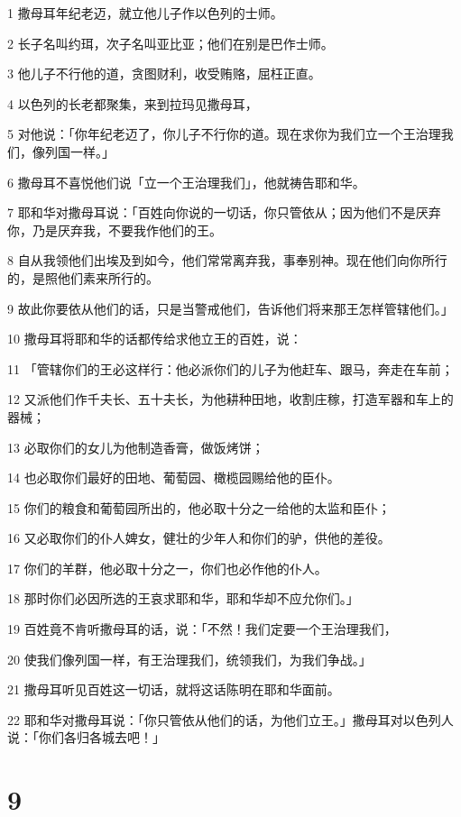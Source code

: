 \par 1 撒母耳年纪老迈，就立他儿子作以色列的士师。
\par 2 长子名叫约珥，次子名叫亚比亚；他们在别是巴作士师。
\par 3 他儿子不行他的道，贪图财利，收受贿赂，屈枉正直。
\par 4 以色列的长老都聚集，来到拉玛见撒母耳，
\par 5 对他说：「你年纪老迈了，你儿子不行你的道。现在求你为我们立一个王治理我们，像列国一样。」
\par 6 撒母耳不喜悦他们说「立一个王治理我们」，他就祷告耶和华。
\par 7 耶和华对撒母耳说：「百姓向你说的一切话，你只管依从；因为他们不是厌弃你，乃是厌弃我，不要我作他们的王。
\par 8 自从我领他们出埃及到如今，他们常常离弃我，事奉别神。现在他们向你所行的，是照他们素来所行的。
\par 9 故此你要依从他们的话，只是当警戒他们，告诉他们将来那王怎样管辖他们。」
\par 10 撒母耳将耶和华的话都传给求他立王的百姓，说：
\par 11 「管辖你们的王必这样行：他必派你们的儿子为他赶车、跟马，奔走在车前；
\par 12 又派他们作千夫长、五十夫长，为他耕种田地，收割庄稼，打造军器和车上的器械；
\par 13 必取你们的女儿为他制造香膏，做饭烤饼；
\par 14 也必取你们最好的田地、葡萄园、橄榄园赐给他的臣仆。
\par 15 你们的粮食和葡萄园所出的，他必取十分之一给他的太监和臣仆；
\par 16 又必取你们的仆人婢女，健壮的少年人和你们的驴，供他的差役。
\par 17 你们的羊群，他必取十分之一，你们也必作他的仆人。
\par 18 那时你们必因所选的王哀求耶和华，耶和华却不应允你们。」
\par 19 百姓竟不肯听撒母耳的话，说：「不然！我们定要一个王治理我们，
\par 20 使我们像列国一样，有王治理我们，统领我们，为我们争战。」
\par 21 撒母耳听见百姓这一切话，就将这话陈明在耶和华面前。
\par 22 耶和华对撒母耳说：「你只管依从他们的话，为他们立王。」撒母耳对以色列人说：「你们各归各城去吧！」

\chapter{9}

